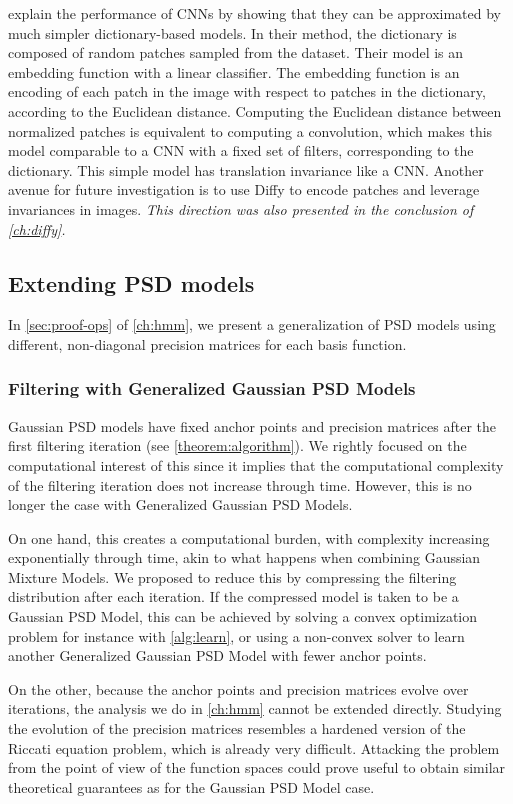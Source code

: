 \cite{thiry} explain the performance of CNNs by showing that they can be approximated by much simpler dictionary-based models. In their method, the dictionary is composed of random patches sampled from the dataset. Their model is an embedding function with a linear classifier. The embedding function is an encoding of each patch in the image with respect to patches in the dictionary, according to the Euclidean distance. Computing the Euclidean distance between normalized patches is equivalent to computing a convolution, which makes this model comparable to a CNN with a fixed set of filters, corresponding to the dictionary. This simple model has translation invariance like a CNN. Another avenue for future investigation is to use Diffy to encode patches and leverage invariances in images. \emph{This direction was also presented in the conclusion of \cref{ch:diffy}.}

\subsection{Extending PSD models }
In \cref{sec:proof-ops} of \cref{ch:hmm}, we present a generalization of PSD models using different, non-diagonal precision matrices for each basis function.

\subsubsection{Filtering with Generalized Gaussian PSD Models} Gaussian PSD models have fixed anchor points and precision matrices after the first filtering iteration (see \cref{theorem:algorithm}). We rightly focused on the computational interest of this since it implies that the computational complexity of the filtering iteration does not increase through time. However, this is no longer the case with Generalized Gaussian PSD Models.

On one hand, this creates a computational burden, with complexity increasing exponentially through time, akin to what happens when combining Gaussian Mixture Models. We proposed to reduce this by compressing the filtering distribution after each iteration. If the compressed model is taken to be a Gaussian PSD Model, this can be achieved by solving a convex optimization problem for instance with \cref{alg:learn}, or using a non-convex solver to learn another Generalized Gaussian PSD Model with fewer anchor points.

On the other, because the anchor points and precision matrices evolve over iterations, the analysis we do in \cref{ch:hmm} cannot be extended directly. Studying the evolution of the precision matrices resembles a hardened version of the Riccati equation problem, which is already very difficult. Attacking the problem from the point of view of the function spaces could prove useful to obtain similar theoretical guarantees as for the Gaussian PSD Model case.

